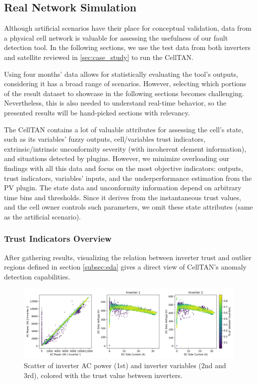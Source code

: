 \subsection{Real Network Simulation}

Although artificial scenarios have their place for conceptual validation, data from a physical cell network is valuable for assessing the usefulness of our fault detection tool. In the following sections, we use the test data from both inverters and satellite reviewed in \ref{sec:case_study} to run the CellTAN.

Using four months' data allows for statistically evaluating the tool's outputs, considering it has a broad range of scenarios. However, selecting which portions of the result dataset to showcase in the following sections becomes challenging. Nevertheless, this is also needed to understand real-time behavior, so the presented results will be hand-picked sections with relevancy.

The CellTAN contains a lot of valuable attributes for assessing the cell's state, such as its variables' fuzzy outputs, cell/variables trust indicators, extrinsic/intrinsic unconformity severity (with incoherent element information), and situations detected by plugins. However, we minimize overloading our findings with all this data and focus on the most objective indicators: outputs, trust indicators, variables' inputs, and the underperformance estimation from the PV plugin. The state data and unconformity information depend on arbitrary time bins and thresholds. Since it derives from the instantaneous trust values, and the cell owner controls such parameters, we omit these state attributes (same as the artificial scenario).

\subsubsection{Trust Indicators Overview}

After gathering results, visualizing the relation between inverter trust and outlier regions defined in section \ref{subsec:eda} gives a direct view of CellTAN's anomaly detection capabilities.

\begin{figure}[h!]
    \centering
    \includegraphics[width=\textwidth]{figures/chapter5/results/real/52_scatter_with_trust-1.png}
    \caption{Scatter of inverter AC power (1st) and inverter variables (2nd and 3rd), colored with the trust value between inverters.}
    \label{fig:real_sim_trust_scatter}
\end{figure}

